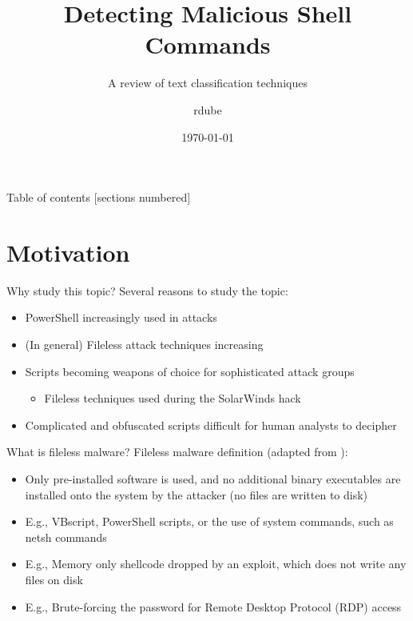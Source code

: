\documentclass[10pt]{beamer}
\title{Detecting Malicious Shell Commands}
\subtitle{A review of text classification techniques}
\date{\today}
\author{rdube}
\begin{document}
\maketitle

\begin{frame}{Table of contents}
  [sections numbered]
  \tableofcontents[hideallsubsections]
\end{frame}

\section{Motivation}

\begin{frame}[fragile]{Why study this topic?}
	Several reasons to study the topic:
	\begin{itemize}
		\item PowerShell increasingly used in attacks \cite{symc2016}
		\item (In general) Fileless attack techniques increasing \cite{symc2017}
		\item Scripts becoming weapons of choice for sophisticated attack groups \cite{msft2017-2}
		\begin{itemize}
			\item Fileless techniques used during the SolarWinds hack \cite{volexity2020,zdnet2021}
		\end{itemize}
		\item Complicated and obfuscated scripts difficult for human analysts to decipher \cite{feye2018}
	\end{itemize}
\end{frame}

\begin{frame}{What is fileless malware?}
	Fileless malware definition (adapted from \cite{symc2017}):
	\begin{itemize}
		\item Only pre-installed software is used, and no additional binary executables are installed onto the system by the attacker (no files are written to disk)
		\item E.g., VBscript, PowerShell scripts, or the use of system commands, such as netsh commands
		\item E.g., Memory only shellcode dropped by an exploit, which does not write any files on disk
		\item E.g., Brute-forcing the password for Remote Desktop Protocol (RDP) access
	\end{itemize}
\end{frame}
\end{document}
